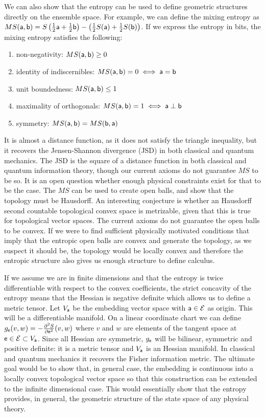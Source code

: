 We can also show that the entropy can be used to define geometric structures directly on the ensemble space. For example, we can define the mixing entropy as $MS(\ens[a], \ens[b]) = S\left(\frac{1}{2}\ens[a] + \frac{1}{2} \ens[b]\right) - \left(\frac{1}{2} S(\ens[a]) + \frac{1}{2} S(\ens[b])\right)$. If we express the entropy in bits, the mixing entropy satisfies the following:
\begin{enumerate}
	\item non-negativity: $MS(\ens[a], \ens[b]) \geq 0$
	\item identity of indiscernibles: $MS(\ens[a], \ens[b]) = 0 \iff \ens[a]=\ens[b]$
	\item unit boundedness: $MS(\ens[a], \ens[b]) \leq 1$
	\item maximality of orthogonals: $MS(\ens[a], \ens[b]) = 1 \iff \ens[a] \ortho \ens[b]$
	\item symmetry: $MS(\ens[a], \ens[b]) = MS(\ens[b], \ens[a])$
\end{enumerate}
It is almost a distance function, as it does not satisfy the triangle inequality, but it recovers the Jensen-Shannon divergence (JSD) in both classical and quantum mechanics. The JSD is the square of a distance function in both classical and quantum information theory, though our current axioms do not guarantee $MS$ to be so. It is an open question whether enough physical constraints exist for that to be the case. The $MS$ can be used to create open balls, and show that the topology must be Hausdorff. An interesting conjecture is whether an Hausdorff second countable topological convex space is metrizable, given that this is true for topological vector spaces. The current axioms do not guarantee the open balls to be convex. If we were to find sufficient physically motivated conditions that imply that the entropic open balls are convex and generate the topology, as we suspect it should be, the topology would be locally convex and therefore the entropic structure also gives us enough structure to define calculus.

If we assume we are in finite dimensions and that the entropy is twice differentiable with respect to the convex coefficients, the strict concavity of the entropy means that the Hessian is negative definite which allows us to define a metric tensor. Let $V_{\ens[a]}$ be the embedding vector space with $\ens[a] \in \Ens$ as origin. This will be a differentiable manifold. On a linear coordinate chart we can define $g_{\ens}( v, w ) = - \frac{\partial^2 S}{\partial \ens ^2}( v, w )$ where $v$ and $w$ are elements of the tangent space at $\ens \in \Ens \subset V_{\ens[a]}$. Since all Hessian are symmetric, $g_{\ens}$ will be bilinear, symmetric and positive definite: it is a metric tensor and $V_{\ens[a]}$ is an Hessian manifold. In classical and quantum mechanics it recovers the Fisher information metric. The ultimate goal would be to show that, in general case, the embedding is continuous into a locally convex topological vector space so that this construction can be extended to the infinite dimensional case. This would essentially show that the entropy provides, in general, the geometric structure of the state space of any physical theory.

